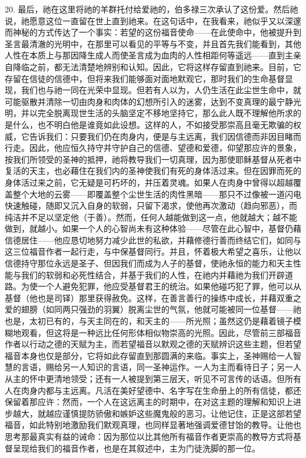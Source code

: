 20. 最后，祂在这里将祂的羊群托付给爱祂的，伯多禄三次承认了这份爱。然后祂说，祂愿意这位一直留在世上直到祂来。在这句话中，在我看来，祂似乎又以深邃而神秘的方式传达了一个事实：若望的这份福音使命——在此使命中，他被提升到圣言最清澈的光明中，在那里可以看见的平等与不变，并且首先我们能看到，其他人性在本质上与那因降生成人而使圣言成为血肉的人性相距何等遥远——直到主亲自降临之前，都无法清楚地辨别和认知。因此，它将这样存留直到祂来。目前，它存留在信徒的信德中，但将来我们能够面对面地默观它，那时我们的生命基督显现，我们也与祂一同在光荣中显现。但若有人以为，人仍生活在此尘世生命中，就可能驱散并清除一切由肉身和肉体的幻想所引入的迷雾，达到不变真理的最宁静光明，并以完全脱离现世生活的头脑坚定不移地坚持它，那么此人既不理解他所求的是什么，也不明白他是谁竟如此设想。这样的人，不如接受那崇高且毫无欺骗的权威，它告诉我们：只要我们仍在肉身内，便是与主远离，我们因信德而非因目睹而行走。因此，他应恒久持守并守护自己的信德、望德和爱德，仰望那应许的景象，按我们所领受的圣神的抵押，祂将教导我们一切真理，因为那使耶稣基督从死者中复活的天主，也必藉住在我们内的圣神使我们有死的身体活过来。但在因罪而死的身体活过来之前，它无疑是可朽坏的，并压着灵魂。如果人在肉身中曾得以超越覆盖整个大地的云雾——即覆盖整个尘世生活的肉性黑暗——那只不过像被一道闪电快速触碰，随即又沉入自身的软弱，只留下渴求，使他再次激动（趋向邪恶），而纯洁并不足以坚定他（于善）。然而，任何人越能做到这一点，他就越大；越不能做到，就越小。如果一个人的心智尚未有这种体验——尽管在此心智中，基督仍藉信德居住——他应恳切地努力减少此世的私欲，并藉修德行善而终结它们，如同与这三位福音作者一起行走，与中保基督同行。并且，怀着极大希望之喜乐，让他以信德持守那位永远是圣子、但因我们而成为人子的基督，使祂永恒的能力和天主性能与我们的软弱和必死性结合，并基于我们的人性，在祂内并藉祂为我们开辟道路。为使一个人避免犯罪，他应受基督君王的统治。如果他碰巧犯了罪，他可以从基督（他也是司铎）那里获得赦免。这样，在善言善行的操练中成长，并藉双重之爱的翅膀（如同两只强劲的羽翼）脱离尘世的气氛，他就可能被同一位基督——祂也是，太初已有的，与天主同在的，和天主的——所光照；虽然这仍是藉着镜子模糊地观看，但这将是一种远比任何形体相似物崇高的光照。因此，尽管前三部福音作者以行动之德的天赋为主，而若望福音以默观之德的天赋辨识这些主题，但若望福音本身也仅是部分，它将如此存留直到那圆满的来临。事实上，圣神赐给一人智慧的言语，赐给另一人知识的言语，同一圣神运作。一人为主而看待日子；另一人从主的怀中更清地领受；还有一人被提到第三层天，听见不可言传的话语。但所有人在肉身内都与主远离。凡活在美好望德中、名字写在生命册上的所有信徒，都还保留着那应许：然而，一个人在这远离主的时期中，在对这主题的理解和知识上进步越大，就越应谨慎提防骄傲和嫉妒这些魔鬼般的恶习。让他记住，正是这部若望福音，如此特别地激励我们默观真理，也同样显著地强调爱德甘饴的教导。让他也思考那最真实有益的诫命：因为那位以比其他所有福音作者更崇高的教导方式将基督呈现给我们的福音作者，也是在其叙述中，主为门徒洗脚的那一位。\par

